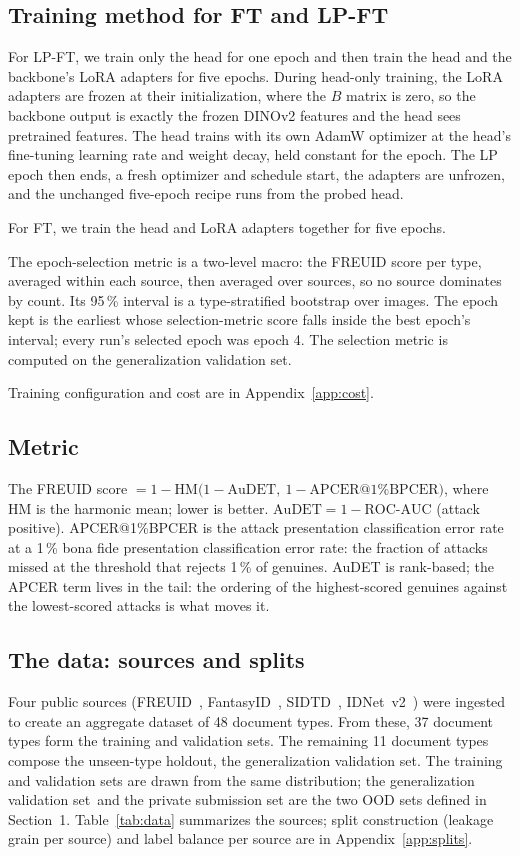 \documentclass[10pt]{article}
\newcommand{\lpft}{LP-FT}
\newcommand{\genval}{generalization validation set}
\begin{document}
\subsection{Training method for FT and \lpft}
\label{sec:training}
For \lpft, we train only the head for one epoch and then train the head and the backbone's LoRA adapters for five epochs. During head-only training, the LoRA adapters are frozen at their initialization, where the $B$ matrix is zero, so the backbone output is exactly the frozen DINOv2 features and the head sees pretrained features. The head trains with its own AdamW optimizer at the head's fine-tuning learning rate and weight decay, held constant for the epoch. The LP epoch then ends, a fresh optimizer and schedule start, the adapters are unfrozen, and the unchanged five-epoch recipe runs from the probed head.

For FT, we train the head and LoRA adapters together for five epochs.

The epoch-selection metric is a two-level macro: the FREUID score per type, averaged within each source, then averaged over sources, so no source dominates by count. Its 95\,\% interval is a type-stratified bootstrap over images. The epoch kept is the earliest whose selection-metric score falls inside the best epoch's interval; every run's selected epoch was epoch 4. The selection metric is computed on the \genval.

Training configuration and cost are in Appendix~\ref{app:cost}.

\subsection{Metric}
The FREUID score $= 1 - \mathrm{HM}\bigl(1-\mathrm{AuDET},\ 1-\mathrm{APCER@1\%BPCER}\bigr)$, where HM is the harmonic mean; lower is better. $\mathrm{AuDET} = 1 - \text{ROC-AUC}$ (attack positive). APCER@1\%BPCER is the attack presentation classification error rate at a 1\,\% bona fide presentation classification error rate: the fraction of attacks missed at the threshold that rejects 1\,\% of genuines. AuDET is rank-based; the APCER term lives in the tail: the ordering of the highest-scored genuines against the lowest-scored attacks is what moves it.

\subsection{The data: sources and splits}
Four public sources (FREUID~\citep{freuid2026}, FantasyID~\citep{korshunov2025fantasyid}, SIDTD~\citep{boned2024sidtd}, IDNet~v2~\citep{guan2024idnet}) were ingested to create an aggregate dataset of 48 document types. From these, 37 document types form the training and validation sets. The remaining 11 document types compose the unseen-type holdout, the \genval. The training and validation sets are drawn from the same distribution; the \genval\ and the private submission set are the two OOD sets defined in Section~1. Table~\ref{tab:data} summarizes the sources; split construction (leakage grain per source) and label balance per source are in Appendix~\ref{app:splits}.
\end{document}

